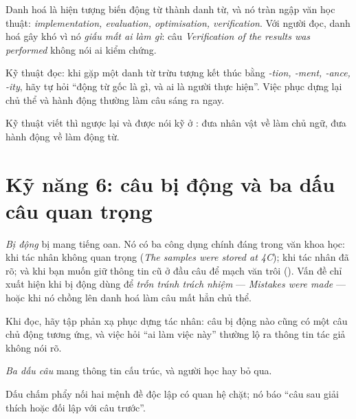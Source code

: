 \documentclass[../../english.tex]{subfiles}
\begin{document}
Danh hoá là hiện tượng biến động từ thành danh từ, và nó tràn ngập văn học thuật: \emph{implementation, evaluation, optimisation, verification}. Với người đọc, danh hoá gây khó vì nó \emph{giấu mất ai làm gì}: câu \emph{Verification of the results was performed} không nói ai kiểm chứng.

Kỹ thuật đọc: khi gặp một danh từ trừu tượng kết thúc bằng \emph{-tion, -ment, -ance, -ity}, hãy tự hỏi ``động từ gốc là gì, và ai là người thực hiện''. Việc phục dựng lại chủ thể và hành động thường làm câu sáng ra ngay.

Kỹ thuật viết thì ngược lại và được nói kỹ ở : đưa nhân vật về làm chủ ngữ, đưa hành động về làm động từ.

\begin{capdoi}
\end{capdoi}

\section{Kỹ năng 6: câu bị động và ba dấu câu quan trọng}

\emph{Bị động} bị mang tiếng oan. Nó có ba công dụng chính đáng trong văn khoa học: khi tác nhân không quan trọng (\emph{The samples were stored at 4\textdegree C}); khi tác nhân đã rõ; và khi bạn muốn giữ thông tin cũ ở đầu câu để mạch văn trôi (). Vấn đề chỉ xuất hiện khi bị động dùng để \emph{trốn tránh trách nhiệm} --- \emph{Mistakes were made} --- hoặc khi nó chồng lên danh hoá làm câu mất hẳn chủ thể.

Khi đọc, hãy tập phản xạ phục dựng tác nhân: câu bị động nào cũng có một câu chủ động tương ứng, và việc hỏi ``ai làm việc này'' thường lộ ra thông tin tác giả không nói rõ.

\emph{Ba dấu câu} mang thông tin cấu trúc, và người học hay bỏ qua.

Dấu chấm phẩy nối hai mệnh đề độc lập có quan hệ chặt; nó báo ``câu sau giải thích hoặc đối lập với câu trước''.
\end{document}
